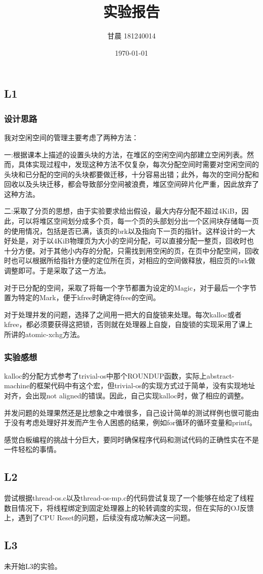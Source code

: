 \documentclass[UTF8]{ctexart}
\title{实验报告}
\author{甘晨 181240014}
\date{\today}
\begin{document}
\maketitle
\subsection{L1}
\subsubsection{设计思路}
\par 我对空闲空间的管理主要考虑了两种方法：

\par 一:根据课本上描述的设置头块的方法，在堆区的空闲空间内部建立空闲列表。然而，具体实现过程中，发现这种方法不仅复杂，每次分配空间时需要对空闲空间的头块和已分配的空间的头块都要做迁移，十分容易出错；此外，每次的空间分配和回收以及头块迁移，都会导致部分空间被浪费，堆区空间碎片化严重，因此放弃了这种方法。

\par 二:采取了分页的思想，由于实验要求给出假设，最大内存分配不超过4KiB，因此，可以将堆区空间划分成多个页，每一个页的头部划分出一个区间块存储每一页的使用情况，包括是否已满，该页的brk以及指向下一页的指针。这样设计的一大好处是，对于以4KiB物理页为大小的空间分配，可以直接分配一整页，回收时也十分方便。对于其他小内存的分配，只需找到用空闲的页，在页中分配空间，回收时也可以根据所给指针方便的定位所在页，对相应的空间做释放，相应页的brk做调整即可。于是采取了这一方法。

\par 对于已分配的空间，采取了将每一个字节都置为设定的Magic，对于最后一个字节置为特定的Mark，便于kfree时确定待free的空间。

\par 对于处理并发的问题，选择了之间用一把大的自旋锁来处理。每次kalloc或者kfree，都必须要获得这把锁，否则就在处理器上自旋，自旋锁的实现采用了课上所讲的atomic-xchg方法。

\subsubsection{实验感想}
\par kalloc的分配方式参考了trivial-os中那个ROUNDUP函数，实际上abstract-machine的框架代码中有这个宏，但trivial-os的实现方式过于简单，没有实现地址对齐，会出现not aligned的错误。因此，自己实现kalloc时，做了相应的调整。

\par 并发问题的处理果然还是比想象之中难很多，自己设计简单的测试样例也很可能由于没有考虑处理好并发而产生令人困惑的结果，例如for循环的循环变量和printf。

\par 感觉白板编程的挑战十分巨大，要同时确保程序代码和测试代码的正确性实在不是一件轻松的事情。

\subsection{L2}
\par 尝试根据thread-os.c以及thread-os-mp.c的代码尝试复现了一个能够在给定了线程数目情况下，将线程绑定到固定处理器上的轮转调度的实现，但在实际的OJ反馈上，遇到了CPU Reset的问题，后续没有成功解决这一问题。

\subsection{L3}
\par 未开始L3的实验。
\end{document}
